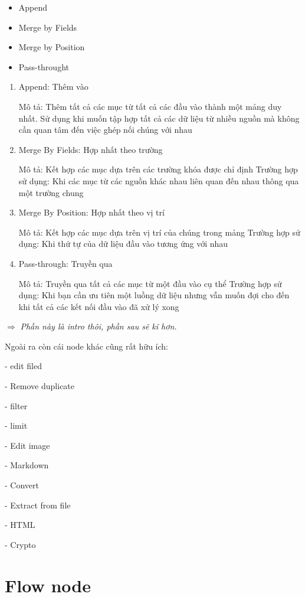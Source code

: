 \begin{itemize}
    \item Append
    \item Merge by Fields
    \item Merge by Position
    \item Pass-throught
\end{itemize}
\begin{enumerate}
    \item Append: Thêm vào

Mô tả: Thêm tất cả các mục từ tất cả các đầu vào thành một mảng duy nhất. Sử dụng khi muốn tập hợp tất cả các dữ liệu từ nhiều nguồn mà không cần quan tâm đến việc ghép nối chúng với nhau

    \item Merge By Fields: Hợp nhất theo trường

Mô tả: Kết hợp các mục dựa trên các trường khóa được chỉ định
Trường hợp sử dụng: Khi các mục từ các nguồn khác nhau liên quan đến nhau thông qua một trường chung

    \item Merge By Position: Hợp nhất theo vị trí

Mô tả: Kết hợp các mục dựa trên vị trí của chúng trong mảng
Trường hợp sử dụng: Khi thứ tự của dữ liệu đầu vào tương ứng với nhau

    \item Pass-through: Truyền qua

Mô tả: Truyền qua tất cả các mục từ một đầu vào cụ thể
Trường hợp sử dụng: Khi bạn cần ưu tiên một luồng dữ liệu nhưng vẫn muốn đợi cho đến khi tất cả các kết nối đầu vào đã xử lý xong
\end{enumerate}

$\Rightarrow$ \textit{Phần này là intro thôi, phần sau sẽ kĩ hơn.}


Ngoài ra còn cái node khác cũng rất hữu ích:

- edit filed

- Remove duplicate

- filter

- limit

- Edit image

- Markdown

- Convert

- Extract from file

- HTML


- Crypto

\section{Flow node}

